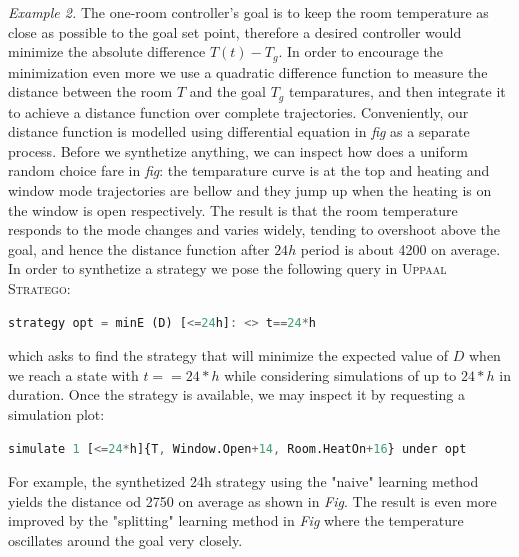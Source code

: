     \emph{Example 2.} The one-room controller's goal is to keep the room temperature as 
    close as possible to the goal set point, therefore a desired controller would minimize 
    the absolute difference $T(t)-T_g$. In order to encourage the minimization even more
    we use a quadratic difference function to measure the distance between the room $T$ 
    and the goal $T_g$ temparatures, and then integrate it to achieve a distance function 
    over complete trajectories. Conveniently, our distance function is modelled using 
    differential equation in \emph{fig} as a separate process. Before we synthetize anything,
    we can inspect how does a uniform random choice fare in \emph{fig}: the temparature curve 
    is at the top and heating and window  mode trajectories are bellow and they jump up
    when the heating is on the window is open respectively. The result is that the room 
    temperature responds to the mode changes and varies widely, tending to overshoot above the
    goal, and hence the distance function after $24h$ period is about 4200 on average. In order
    to synthetize a strategy we pose the following query in \textsc{Uppaal Stratego}:

    \begin{lstlisting}[language=Octave]
        strategy opt = minE (D) [<=24h]: <> t==24*h
    \end{lstlisting}

    which asks to find the strategy that will minimize the expected value of $D$ when we reach
    a state with $t == 24*h$ while considering simulations of up to $24*h$ in duration. Once
    the strategy is available, we may inspect it by requesting a simulation plot:

    \begin{lstlisting}[language=Octave]
        simulate 1 [<=24*h]{T, Window.Open+14, Room.HeatOn+16} under opt
    \end{lstlisting}

    For example, the synthetized 24h strategy using the "naive" learning method yields
    the distance od 2750 on average as shown in \emph{Fig}. The result is even more improved
    by  the "splitting" learning method in \emph{Fig} where the temperature oscillates around
    the goal very closely.

